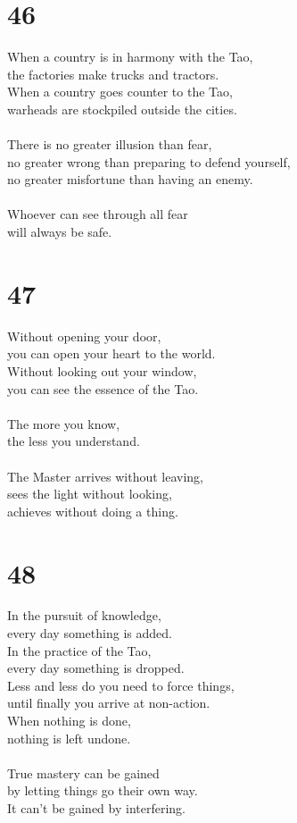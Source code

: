 \documentclass[b5paper, 12pt, oneside]{book}
\begin{document}
\chapter*{46}
When a country is in harmony with the Tao,\\
the factories make trucks and tractors.\\
When a country goes counter to the Tao,\\
warheads are stockpiled outside the cities.\\
\\
There is no greater illusion than fear,\\
no greater wrong than preparing to defend yourself,\\
no greater misfortune than having an enemy.\\
\\
Whoever can see through all fear\\
will always be safe.\\

\chapter*{47}
Without opening your door,\\
you can open your heart to the world.\\
Without looking out your window,\\
you can see the essence of the Tao.\\
\\
The more you know,\\
the less you understand.\\
\\
The Master arrives without leaving,\\
sees the light without looking,\\
achieves without doing a thing.\\

\chapter*{48}
In the pursuit of knowledge,\\
every day something is added.\\
In the practice of the Tao,\\
every day something is dropped.\\
Less and less do you need to force things,\\
until finally you arrive at non-action.\\
When nothing is done,\\
nothing is left undone.\\
\\
True mastery can be gained\\
by letting things go their own way.\\
It can't be gained by interfering.\\
\end{document}
